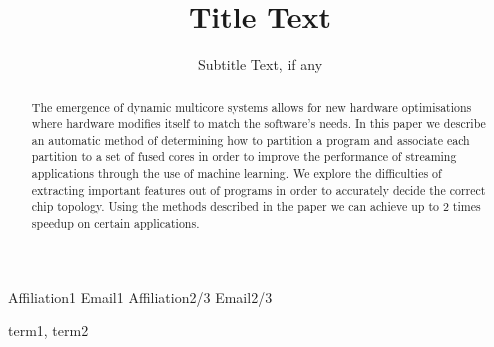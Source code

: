 \documentclass{sigplanconf}
\begin{document}
\setlength{\pdfpageheight}{\paperheight}
\setlength{\pdfpagewidth}{\paperwidth}






\title{Title Text}
\subtitle{Subtitle Text, if any}

           {Affiliation1}
           {Email1}
           {Affiliation2/3}
           {Email2/3}

\maketitle

\begin{abstract}
    The emergence of dynamic multicore systems allows for new hardware
    optimisations where hardware modifies itself to match the software's needs.
    In this paper we describe an automatic method of determining how to
    partition a program and associate each partition to a set of fused cores in
    order  to improve the performance of streaming applications through the use
    of machine learning. We explore the difficulties of extracting important
    features out of programs in order to accurately decide the correct chip
    topology.  Using the methods described in the paper we can achieve up to 2
    times speedup on certain applications.
\end{abstract}


\terms
term1, term2
\end{document}
